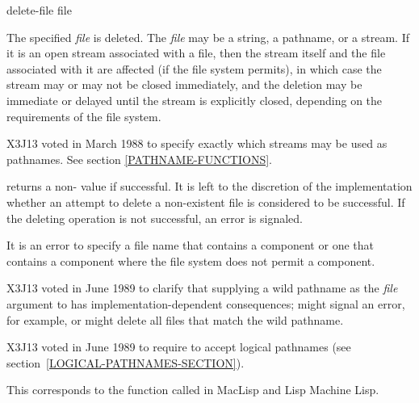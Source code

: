 \begin{defun}[Function]
delete-file file

The specified \emph{file} is deleted.  The \emph{file} may be a string, a
pathname, or a stream.  If it is an open stream associated with a file,
then the stream itself and the file associated with it are affected (if
the file system permits), in which case the stream may or may not be
closed immediately, and the deletion may be immediate or delayed until
the stream is explicitly closed, depending on the requirements of the
file system.

\begin{new}
X3J13 voted in March 1988
to specify exactly which streams may be used as pathnames.
See section \ref{PATHNAME-FUNCTIONS}.
\end{new}

 returns a non-{\nil} value if successful.
It is left to the discretion of the implementation whether an attempt
to delete a non-existent file is considered to be successful.
If the deleting operation is not successful, an error is signaled.

\begin{obsolete}
It is an error to specify a file name that contains a  component
or one that contains a {\nil} component where the file system does not
permit a {\nil} component.
\end{obsolete}
\begin{newer}
X3J13 voted in June 1989 
to clarify that supplying a wild pathname
as the \emph{file} argument to  has implementation-dependent consequences;
 might signal an error, for example,
or might delete all files that match the wild pathname.
\end{newer}

\begin{newer}
X3J13 voted in June 1989  to require 
to accept logical pathnames (see section~\ref{LOGICAL-PATHNAMES-SECTION}).
\end{newer}

\beforenoterule
\begin{incompatibility}
This corresponds to the function
called  in MacLisp and Lisp Machine Lisp.
\end{incompatibility}
\afternoterule
\end{defun}

